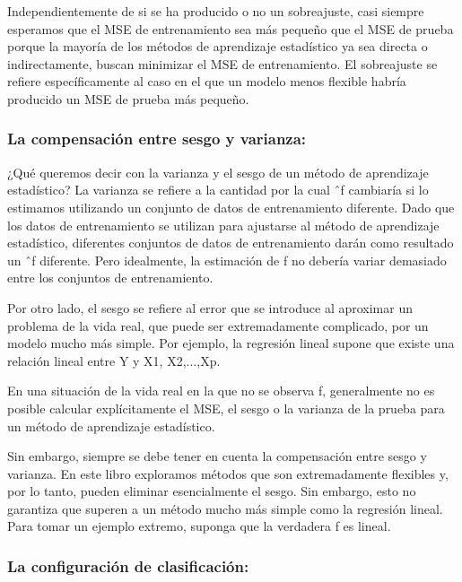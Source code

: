 \documentclass[
  letterpaper,
  DIV=11,
  numbers=noendperiod]{scrartcl}
\begin{document}
Independientemente de si se ha producido o no un sobreajuste, casi
siempre esperamos que el MSE de entrenamiento sea más pequeño que el MSE
de prueba porque la mayoría de los métodos de aprendizaje estadístico ya
sea directa o indirectamente, buscan minimizar el MSE de entrenamiento.
El sobreajuste se refiere específicamente al caso en el que un modelo
menos flexible habría producido un MSE de prueba más pequeño.

\hypertarget{la-compensaciuxf3n-entre-sesgo-y-varianza}{%
\subsubsection{\texorpdfstring{\textbf{La compensación entre sesgo y
varianza:}}{La compensación entre sesgo y varianza:}}\label{la-compensaciuxf3n-entre-sesgo-y-varianza}}

¿Qué queremos decir con la varianza y el sesgo de un método de
aprendizaje estadístico? La varianza se refiere a la cantidad por la
cual ˆf cambiaría si lo estimamos utilizando un conjunto de datos de
entrenamiento diferente. Dado que los datos de entrenamiento se utilizan
para ajustarse al método de aprendizaje estadístico, diferentes
conjuntos de datos de entrenamiento darán como resultado un ˆf
diferente. Pero idealmente, la estimación de f no debería variar
demasiado entre los conjuntos de entrenamiento.

Por otro lado, el sesgo se refiere al error que se introduce al
aproximar un problema de la vida real, que puede ser extremadamente
complicado, por un modelo mucho más simple. Por ejemplo, la regresión
lineal supone que existe una relación lineal entre Y y X1, X2,...,Xp.

En una situación de la vida real en la que no se observa f, generalmente
no es posible calcular explícitamente el MSE, el sesgo o la varianza de
la prueba para un método de aprendizaje estadístico.

Sin embargo, siempre se debe tener en cuenta la compensación entre sesgo
y varianza. En este libro exploramos métodos que son extremadamente
flexibles y, por lo tanto, pueden eliminar esencialmente el sesgo. Sin
embargo, esto no garantiza que superen a un método mucho más simple como
la regresión lineal. Para tomar un ejemplo extremo, suponga que la
verdadera f es lineal.

\hypertarget{la-configuraciuxf3n-de-clasificaciuxf3n}{%
\subsubsection{\texorpdfstring{\textbf{La configuración de
clasificación:}}{La configuración de clasificación:}}\label{la-configuraciuxf3n-de-clasificaciuxf3n}}
\end{document}
